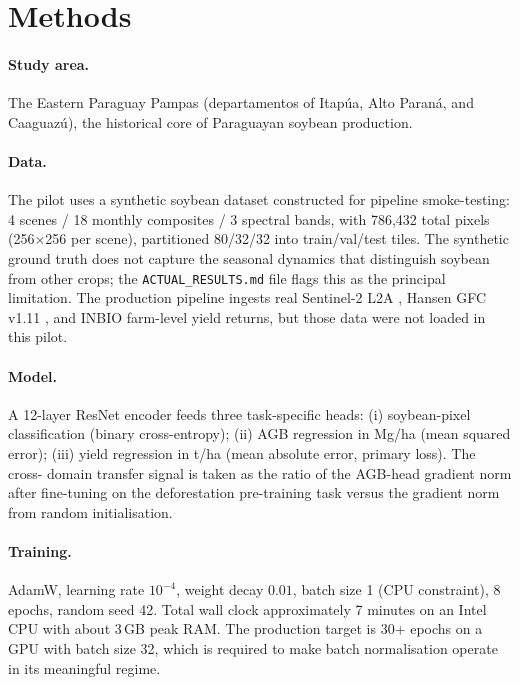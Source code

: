 \section{Methods}
\label{sec:yrupe-methods}

\paragraph{Study area.} The Eastern Paraguay Pampas (departamentos of
Itap\'ua, Alto Paran\'a, and Caaguaz\'u), the historical core of
Paraguayan soybean production.

\paragraph{Data.} The pilot uses a synthetic soybean dataset
constructed for pipeline smoke-testing: 4 scenes / 18 monthly
composites / 3 spectral bands, with 786{,}432 total pixels
(256$\times$256 per scene), partitioned 80/32/32 into train/val/test
tiles. The synthetic ground truth does not capture the seasonal
dynamics that distinguish soybean from other crops; the
\texttt{ACTUAL\_RESULTS.md} file flags this as the principal limitation.
The production pipeline ingests real Sentinel-2 L2A \citep{esa2015},
Hansen GFC v1.11 \citep{hansen2013}, and INBIO farm-level yield
returns, but those data were not loaded in this pilot.

\paragraph{Model.} A 12-layer ResNet encoder feeds three task-specific
heads: (i) soybean-pixel classification (binary cross-entropy);
(ii) AGB regression in Mg/ha (mean squared error); (iii) yield
regression in t/ha (mean absolute error, primary loss). The cross-
domain transfer signal is taken as the ratio of the AGB-head gradient
norm after fine-tuning on the deforestation pre-training task versus
the gradient norm from random initialisation.

\paragraph{Training.} AdamW, learning rate $10^{-4}$, weight decay
$0.01$, batch size 1 (CPU constraint), 8 epochs, random seed 42. Total
wall clock approximately 7 minutes on an Intel CPU with about 3\,GB peak
RAM. The production target is 30+ epochs on a GPU with batch size 32,
which is required to make batch normalisation operate in its
meaningful regime.

